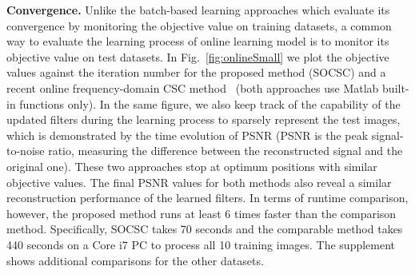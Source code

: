 {\bfseries Convergence.} Unlike the batch-based learning approaches
which evaluate its convergence by monitoring the objective value on
training datasets, a common way to evaluate the learning process of
online learning model is to monitor its objective value on test
datasets. In Fig.~\ref{fig:onlineSmall} we plot the objective values
against the iteration number for the proposed method (SOCSC) and a
recent online frequency-domain CSC method~\cite{liu-2018-first} (both
 approaches use Matlab built-in functions only). In
the same figure, we also keep track of the capability of the updated
filters during the learning process to sparsely represent the test
images, which is demonstrated by the time evolution of PSNR (PSNR is the 
peak signal-to-noise ratio, measuring the difference between the 
reconstructed signal and the original one). These two
approaches stop at optimum positions with similar objective values.
The final PSNR values for both methods also reveal a similar
reconstruction performance of the learned filters. In terms of runtime
comparison, however, the proposed method runs at least $6$ times faster
than the comparison method. Specifically, SOCSC takes 70 seconds and the comparable method takes 440 seconds on a Core i7 PC to process all 10 training images. The supplement shows additional comparisons for the other datasets.


